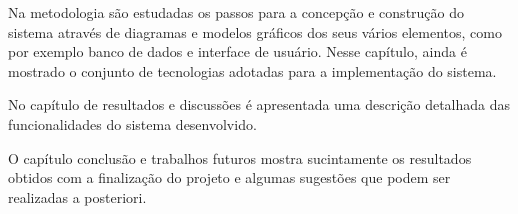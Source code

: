 Na metodologia são estudadas os passos para a concepção e construção do sistema através de diagramas e modelos gráficos dos seus vários elementos, como por exemplo banco de dados e interface de usuário. Nesse capítulo, ainda é mostrado o conjunto de tecnologias adotadas para a implementação do sistema.    

No capítulo de resultados e discussões é apresentada uma descrição detalhada das funcionalidades do sistema desenvolvido.

O capítulo conclusão e trabalhos futuros mostra sucintamente os resultados obtidos com a finalização do projeto e algumas sugestões que podem ser realizadas a posteriori.

